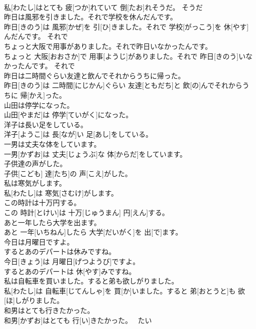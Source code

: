 \documentclass[8pt]{extreport}
\begin{document}
\begin{CJK}{UTF8}{min}
\\	私[わたし]はとても 疲[つか]れていて 倒[たお]れそうだ。	そうだ 
\\	昨日は風邪を引きました。それで学校を休んだんです。	
\\	昨日[きのう]は 風邪[かぜ]を 引[ひ]きました。それで 学校[がっこう]を 休[やす]んだんです。	それで 
\\	ちょっと大阪で用事がありました。それで昨日いなかったんです。	
\\	ちょっと 大阪[おおさか]で 用事[ようじ]がありました。それで 昨日[きのう]いなかったんです。	それで 
\\	昨日は二時間ぐらい友達と飲んでそれからうちに帰った。	
\\	昨日[きのう]は 二時間[にじかん]ぐらい 友達[ともだち]と 飲[の]んでそれからうちに 帰[かえ]った。	
\\	山田は停学になった。	
\\	山田[やまだ]は 停学[ていがく]になった。	
\\	洋子は長い足をしている。	
\\	洋子[ようこ]は 長[なが]い 足[あし]をしている。	
\\	一男は丈夫な体をしています。	
\\	一男[かずお]は 丈夫[じょうぶ]な 体[からだ]をしています。	
\\	子供達の声がした。	
\\	子供[こども] 達[たち]の 声[こえ]がした。	
\\	私は寒気がします。	
\\	私[わたし]は 寒気[さむけ]がします。	
\\	この時計は十万円する。	
\\	この 時計[とけい]は 十万[じゅうまん] 円[えん]する。	
\\	あと一年したら大学を出ます。	
\\	あと 一年[いちねん]したら 大学[だいがく]を 出[で]ます。	
\\	今日は月曜日ですよ。 
\\	するとあのデパートは休みですね。	
\\	今日[きょう]は 月曜日[げつようび]ですよ。 
\\	するとあのデパートは 休[やす]みですね。	
\\	私は自転車を買いました。すると弟も欲しがりました。	
\\	私[わたし]は 自転車[じてんしゃ]を 買[か]いました。すると 弟[おとうと]も 欲[ほ]しがりました。	
\\	和男はとても行きたかった。	
\\	和男[かずお]はとても 行[い]きたかった。	~たい 

\end{CJK}
\end{document}
